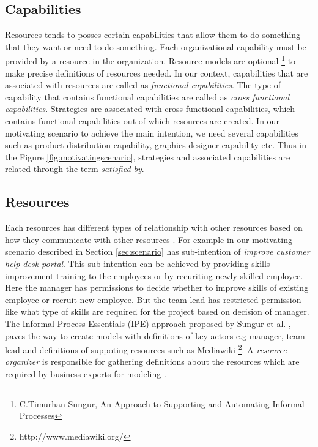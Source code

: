 \subsection{Capabilities}
\label{sec:capabilities}
Resources tends to posses certain capabilities that allow them to do something that they want or need to do something. Each organizational capability must be provided by a resource in the organization. Resource models are optional \footnote{C.Timurhan Sungur, An Approach to Supporting and Automating Informal Processes} to make precise definitions of resources needed. In our context, capabilities that are associated with resources are called as \textit{functional capabilities}. The type of capability that contains functional capabilities are called as \textit{cross functional capabilities}. Strategies are associated with cross functional capabilities, which contains functional capabilities out of which resources are created. In our motivating scenario to achieve the main intention, we need several capabilities such as product distribution capability, graphics designer capability etc. Thus in the Figure \ref{fig:motivatingscenario}, strategies and associated capabilities are related through the term \textit{satisfied-by}. 

\subsection{Resources} 
\label{sec:resources}
Each resources has different types of relationship with other resources based on how they communicate with other resources \cite{Sungur2015}. For example in our motivating scenario described in Section \ref{sec:scenario} has sub-intention of \textit{improve customer help desk portal}. This sub-intention can be achieved by providing skills improvement training to the employees or by recuriting newly skilled employee. Here the manager has permissions to decide whether to improve skills of existing employee or recruit new employee. But the team lead has restricted permission like what type of skills are required for the project based on decision of manager. The Informal Process Essentials (IPE) approach proposed by Sungur et al. \cite{Sungur2015}, paves the way to create models with definitions of key actors e.g manager, team lead and definitions of suppoting resources such as Mediawiki \footnote{http://www.mediawiki.org/}. A \textit{resource organizer} is responsible for gathering definitions about the resources which are required by business experts for modeling \cite{Sungur2014a}.  


